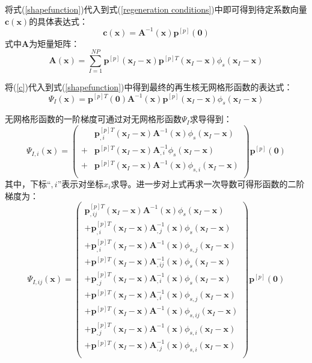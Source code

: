 将式(\ref{shapefunction})代入到式(\ref{regeneration conditions})中即可得到待定系数向量$\pmb{c}(\pmb{x})$的具体表达式：
\begin{equation}\label{c}
    \pmb{c}(\pmb{x})=\pmb{A}^{-1}(\pmb{x})\pmb{p}^{[p]}(\pmb{0})
\end{equation}
式中$\pmb{A}$为矩量矩阵：
\begin{equation}
        \pmb{A}(\pmb{x})=\sum_{I=1}^{N\!P}\pmb{p}^{[p]}(\pmb{x}_I-\pmb{x})\pmb{p}^{[p]T}(\pmb{x}_I-\pmb{x})\phi_s(\pmb{x}_I-\pmb{x})
\end{equation}\par
将(\ref{c})代入到式(\ref{shapefunction})中得到最终的再生核无网格形函数的表达式：
\begin{equation}\label{Pshapefunction}
        \Psi_I(\pmb{x})=\pmb{p}^{[p]T}(\pmb{0})\pmb{A}^{-1}(\pmb{x})\pmb{p}^{[p]}(\pmb{x}_I-\pmb{x})\phi_s(\pmb{x}_I-\pmb{x})
\end{equation}\par
无网格形函数的一阶梯度可通过对无网格形函数$\Psi_I$求导得到：
\begin{equation}
    \Psi_{I,i}(\pmb{x})=\left ( \begin{aligned}
    &\pmb p_{,i}^{[p]T}(\pmb x_I-\pmb x)\pmb A^{-1}(\pmb x)\phi_s(\pmb x_I-\pmb x)\\
    +&\pmb p^{[p]T}(\pmb x_I-\pmb x)\pmb A_{,i}^{-1}\phi_s(\pmb x_I-\pmb x)\\
    +&\pmb p^{[p]T}(\pmb x_I-\pmb x)\pmb A^{-1}(\pmb x)\phi _{s,i}(\pmb x_I-\pmb x)\\
    \end{aligned} \right)
    \pmb p^{[p]}(\pmb 0)
\end{equation}
其中，下标“$,i$”表示对坐标$x_i$求导。进一步对上式再求一次导数可得形函数的二阶梯度为：
\begin{equation}
    \Psi_{I,ij}(\pmb{x})=\left( \begin{aligned}
    \pmb p_{,ij}^{[p]T}(\pmb x_I-\pmb x)\pmb A^{-1}(\pmb x)\phi_s(\pmb x_I-\pmb x)\\
    +\pmb p_{,i}^{[p]T}(\pmb x_I-\pmb x)\pmb A_{,j}^{-1}(\pmb x)\phi_s(\pmb x_I-\pmb x)\\
    +\pmb p_{,i}^{[p]T}(\pmb x_I-\pmb x)\pmb A^{-1}(\pmb x)\phi_{s,j}(\pmb x_I-\pmb x)\\
    +\pmb p^{[p]T}(\pmb x_I-\pmb x)\pmb A_{,ij}^{-1}(\pmb x)\phi_s(\pmb x_I-\pmb x)\\
    +\pmb p_{,j}^{[p]T}(\pmb x_I-\pmb x)\pmb A_{,i}^{-1}(\pmb x)\phi_s(\pmb x_I-\pmb x)\\
    +\pmb p^{[p]T}(\pmb x_I-\pmb x)\pmb A_{,i}^{-1}(\pmb x)\phi_{s,j}(\pmb x_I-\pmb x)\\
    +\pmb p^{[p]T}(\pmb x_I-\pmb x)\pmb A^{-1}(\pmb x)\phi_{s,ij}(\pmb x_I-\pmb x)\\
    +\pmb p_{,j}^{[p]T}(\pmb x_I-\pmb x)\pmb A^{-1}(\pmb x)\phi_{s,i}(\pmb x_I-\pmb x)\\
    +\pmb p^{[p]T}(\pmb x_I-\pmb x)\pmb A_{,j}^{-1}(\pmb x)\phi_{s,i}(\pmb x_I-\pmb x)\\
   \end{aligned} \right)
    \pmb p^{[p]}(\pmb 0)
\end{equation}
